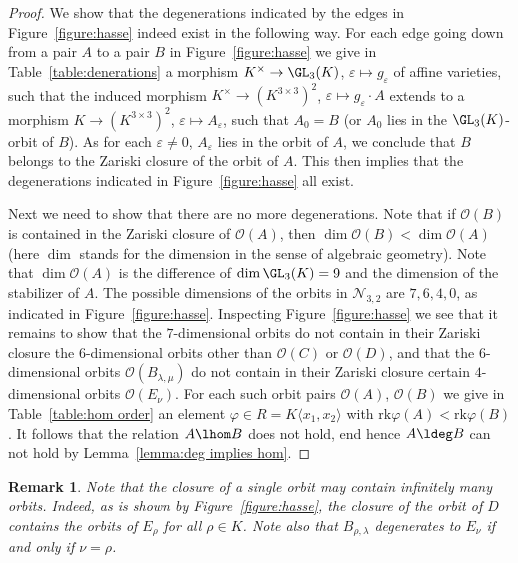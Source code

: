 \documentclass[12pt]{amsart}
\newtheorem{remark}[theorem]{\bf Remark}
\newcommand{\field}{K}
\newcommand{\rank}{\mathrm{rk}}
\begin{document}
\begin{proof} 
We show that the degenerations indicated by the edges in 
Figure~\ref{figure:hasse} indeed exist in the following way. For each edge going down 
from a pair $A$ to a pair $B$ in Figure~\ref{figure:hasse} we give in Table~\ref{table:denerations} 
a morphism $\field^\times \to \GL_3(\field)$, 
$\varepsilon\mapsto g_\varepsilon$ of affine varieties, such that the induced morphism 
$\field^\times \to (\field^{3\times 3})^2$, $\varepsilon\mapsto g_\varepsilon \cdot A$ 
extends to a morphism $\field\to (\field^{3\times 3})^2$, $\varepsilon\mapsto A_\varepsilon$, 
such that $A_0=B$ (or $A_0$ lies in the 
$\GL_3(\field)$-orbit of $B$). As for each $\varepsilon \neq 0$, 
$A_{\varepsilon}$ lies in the orbit of $A$, we conclude that $B$ belongs to the Zariski closure 
of the orbit of $A$. 
This then implies that the degenerations indicated in Figure~\ref{figure:hasse} all exist. 

Next we need to show that there are no more degenerations. Note that if $\mathcal{O}(B)$ is contained 
in the Zariski closure of 
$\mathcal{O}(A)$, then $\dim\mathcal{O}(B)<\dim\mathcal{O}(A)$ 
(here $\dim$ stands for the dimension in the sense of algebraic geometry). 
Note that $\dim\mathcal{O}(A)$ is the difference of $\dim\GL_3(\field)=9$ and the dimension of 
the stabilizer of $A$. The possible dimensions of the orbits in $\mathcal{N}_{3,2}$ are 
$7,6,4,0$, as indicated in Figure~\ref{figure:hasse}. Inspecting Figure~\ref{figure:hasse} we see that 
it remains to show that the $7$-dimensional orbits do not contain in their Zariski closure the $6$-dimensional 
orbits other than $\mathcal{O}(C)$ or $\mathcal{O}(D)$, and that the $6$-dimensional orbits $\mathcal{O}(B_{\lambda,\mu})$ 
do not contain in their Zariski closure certain $4$-dimensional orbits $\mathcal{O}(E_\nu)$. 
For each such orbit pairs $\mathcal{O}(A)$, $\mathcal{O}(B)$ we give in Table~\ref{table:hom order} an 
element $\varphi\in R=\field\langle x_1,x_2\rangle$ with $\rank\varphi(A)<\rank\varphi(B)$. 
It follows that the relation $A\lhom B$ does not hold, end hence $A\ldeg B$ can not hold by Lemma~\ref{lemma:deg implies hom}. 
\end{proof}

\begin{remark}
Note that the closure of a single orbit may contain infinitely many orbits. 
Indeed, as is shown by Figure~\ref{figure:hasse}, the closure of the orbit of $D$ contains 
the orbits of $E_{\rho}$ for all $\rho\in \field$. 
Note also that $B_{\rho,\lambda}$ degenerates to 
$E_{\nu}$ if and only if $\nu=\rho$. 
\end{remark}
\end{document}
